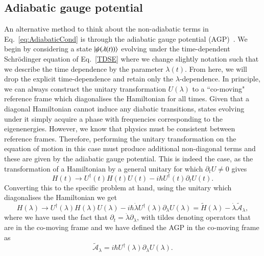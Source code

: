 \subsection{Adiabatic gauge potential}

An alternative method to think about the non-adiabatic terms in Eq.~\eqref{eq:AdiabaticCond} is through the adiabatic gauge potential (AGP)~\cite{sels2017minimizing,kolodrubetz2017geometry}. We begin by considering a state $\ket{\psi(\lambda(t))}$ evolving under the time-dependent Schr\"odinger equation of Eq.~\eqref{TDSE} where we change slightly notation such that we describe the time dependence by the parameter $\lambda(t)$. From here, we will drop the explicit time-dependence and retain only the $\lambda$-dependence. In principle, we can always construct the unitary transformation $U(\lambda)$ to a ``co-moving" reference frame which diagonalises the Hamiltonian for all times. Given that a diagonal Hamiltonian cannot induce any diabatic transitions, states evolving under it simply acquire a phase with frequencies corresponding to the eigenenergies. However, we know that physics must be consistent between reference frames. Therefore, performing the unitary transformation on the equation of motion in this case must produce additional non-diagonal terms and these are given by the adiabatic gauge potential. This is indeed the case, as the transformation of a Hamiltonian by a general unitary for which $\partial_t U \neq 0$ gives
\begin{equation}
    H(t) \rightarrow U^\dagger(t) H(t) U(t) - i \hbar U^\dagger(t)\partial_t U(t).
\end{equation}
Converting this to the specific problem at hand, using the unitary which diagonalises the Hamiltonian we get
\begin{equation}
    H(\lambda) \rightarrow U^\dagger(\lambda) H(\lambda) U(\lambda) - i \hbar \dot{\lambda} U^\dagger(\lambda)\partial_\lambda U(\lambda) = \tilde{H}(\lambda) - \dot{\lambda} \tilde{\mathcal{A}}_\lambda,
\end{equation}
where we have used the fact that $\partial_t = \dot{\lambda} \partial_\lambda$, with tildes denoting operators that are in the co-moving frame and we have defined the AGP in the co-moving frame as
\begin{equation}
    \tilde{\mathcal{A}}_\lambda = i \hbar U^\dagger(\lambda)\partial_\lambda U(\lambda).
\end{equation}

